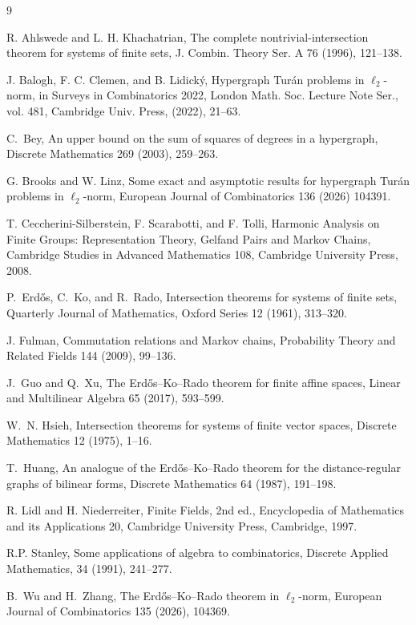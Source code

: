 \documentclass[11pt]{article}
\theoremstyle{definition}
\begin{document}
\begin{thebibliography}{9}
\small \setlength{\itemsep}{-.10mm}

R. Ahlswede and L. H. Khachatrian, 
\newblock The complete nontrivial-intersection theorem for systems of finite sets, 
\newblock J. Combin. Theory Ser. A  76 (1996), 121--138.

J. Balogh, F. C. Clemen, and B. Lidick\'y, 
\newblock Hypergraph Tur\'an problems in $\ell_2$-norm, in Surveys in Combinatorics 2022, 
\newblock London Math. Soc. Lecture Note Ser., vol. 481, Cambridge Univ. Press, (2022), 21--63.

C.~Bey,
\newblock An upper bound on the sum of squares of degrees in a hypergraph,
\newblock Discrete Mathematics 269 (2003), 259--263.

G. Brooks and W. Linz, 
\newblock Some exact and asymptotic results for hypergraph Tur\'an problems in $\ell_2$-norm, 
\newblock European Journal of Combinatorics 136 (2026) 104391.

T. Ceccherini-Silberstein, F. Scarabotti, and F. Tolli,
\newblock Harmonic Analysis on Finite Groups: Representation Theory, Gelfand Pairs and Markov Chains, 
\newblock Cambridge Studies in Advanced Mathematics 108, Cambridge University Press, 2008.

P.~Erd\H{o}s, C.~Ko, and R.~Rado,
\newblock Intersection theorems for systems of finite sets,
\newblock Quarterly Journal of Mathematics, Oxford Series 12 (1961), 313--320.

J. Fulman, 
\newblock Commutation relations and Markov chains,
\newblock Probability Theory and Related Fields 144 (2009), 99--136.

J.~Guo and Q.~Xu,
\newblock The Erd\H{o}s--Ko--Rado theorem for finite affine spaces,
\newblock Linear and Multilinear Algebra 65 (2017), 593--599.

W.~N. Hsieh,
\newblock Intersection theorems for systems of finite vector spaces,
\newblock Discrete Mathematics 12 (1975), 1--16.

T.~Huang,
\newblock An analogue of the Erd\H{o}s--Ko--Rado theorem for the distance-regular graphs of bilinear forms,
\newblock Discrete Mathematics 64 (1987), 191--198.

R. Lidl and H. Niederreiter,
\newblock Finite Fields, 2nd ed., 
\newblock Encyclopedia of Mathematics and its Applications 20, Cambridge University Press, Cambridge, 1997.

R.P. Stanley, 
\newblock Some applications of algebra to combinatorics,
\newblock Discrete Applied Mathematics, 34 (1991), 241--277.

B.~Wu and H.~Zhang,
\newblock The Erd\H{o}s--Ko--Rado theorem in $\ell_2$-norm,
\newblock European Journal of Combinatorics 135 (2026), 104369.

\end{thebibliography}
\end{document}
